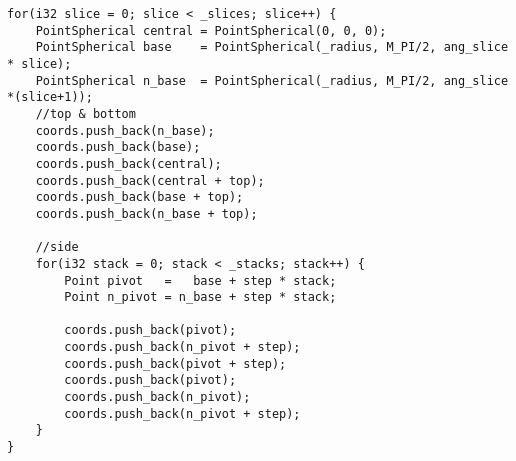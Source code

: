 \begin{lstlisting}
for(i32 slice = 0; slice < _slices; slice++) {
    PointSpherical central = PointSpherical(0, 0, 0);
    PointSpherical base    = PointSpherical(_radius, M_PI/2, ang_slice * slice);
    PointSpherical n_base  = PointSpherical(_radius, M_PI/2, ang_slice *(slice+1));
    //top & bottom
    coords.push_back(n_base);
    coords.push_back(base);
    coords.push_back(central);
    coords.push_back(central + top);
    coords.push_back(base + top);
    coords.push_back(n_base + top);

    //side
    for(i32 stack = 0; stack < _stacks; stack++) {
        Point pivot   =   base + step * stack;
        Point n_pivot = n_base + step * stack;

        coords.push_back(pivot);
        coords.push_back(n_pivot + step);
        coords.push_back(pivot + step);
        coords.push_back(pivot);
        coords.push_back(n_pivot);
        coords.push_back(n_pivot + step);
    }
}
\end{lstlisting}
